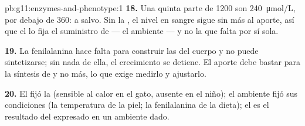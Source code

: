\begin{solution}{pb:g11:enzymes-and-phenotype:1}
\textbf{18.} Una quinta parte de \num{1200} son
\qty{240}{\micro mol/L}, por debajo de \num{360}: a salvo. Sin la
, el nivel en sangre sigue sin más al aporte, así que el 
lo fija el suministro de  --- el ambiente --- y no la 
que falta por sí sola.

\textbf{19.} La fenilalanina hace falta para construir las 
del cuerpo y no puede sintetizarse; sin nada de ella, el crecimiento se
detiene. El aporte debe bastar para la síntesis de  y no más,
lo que exige medirlo y ajustarlo.

\textbf{20.} El  fijó la  (sensible al calor en el gato,
ausente en el niño); el ambiente fijó sus condiciones (la temperatura
de la piel; la fenilalanina de la dieta); el  es el resultado
del  expresado en un ambiente dado.
\end{solution}
